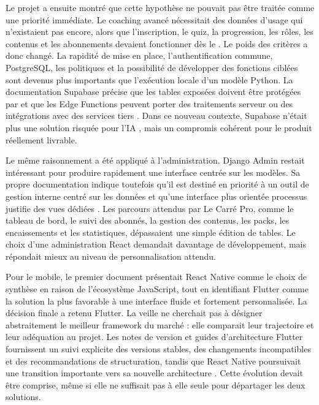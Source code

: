 Le projet a ensuite montré que cette hypothèse ne pouvait pas être traitée comme une priorité immédiate. Le coaching avancé nécessitait des données d'usage qui n'existaient pas encore, alors que l'inscription, le quiz, la progression, les rôles, les contenus et les abonnements devaient fonctionner dès le . Le poids des critères a donc changé. La rapidité de mise en place, l'authentification commune, PostgreSQL, les politiques  et la possibilité de développer des fonctions ciblées sont devenus plus importants que l'exécution locale d'un modèle Python. La documentation Supabase précise que les tables exposées doivent être protégées par  et que les Edge Functions peuvent porter des traitements serveur ou des intégrations avec des services tiers \cite{supabase-rls,supabase-edge-functions}. Dans ce nouveau contexte, Supabase n'était plus une solution \og risquée pour l'IA \fg{}, mais un compromis cohérent pour le produit réellement livrable.

Le même raisonnement a été appliqué à l'administration. Django Admin restait intéressant pour produire rapidement une interface centrée sur les modèles. Sa propre documentation indique toutefois qu'il est destiné en priorité à un outil de gestion interne centré sur les données et qu'une interface plus orientée processus justifie des vues dédiées \cite{django-admin}. Les parcours attendus par Le Carré Pro, comme le tableau de bord, le suivi des abonnés, la gestion des contenus, les packs, les encaissements et les statistiques, dépassaient une simple édition de tables. Le choix d'une administration React demandait davantage de développement, mais répondait mieux au niveau de personnalisation attendu.

Pour le mobile, le premier document présentait React Native comme le choix de synthèse en raison de l'écosystème JavaScript, tout en identifiant Flutter comme la solution la plus favorable à une interface fluide et fortement personnalisée. La décision finale a retenu Flutter. La veille ne cherchait pas à désigner abstraitement le meilleur framework du marché : elle comparait leur trajectoire et leur adéquation au projet. Les notes de version et guides d'architecture Flutter fournissent un suivi explicite des versions stables, des changements incompatibles et des recommandations de structuration, tandis que React Native poursuivait une transition importante vers sa nouvelle architecture \cite{flutter-releases,flutter-architecture,react-native-new-architecture}. Cette évolution devait être comprise, même si elle ne suffisait pas à elle seule pour départager les deux solutions.

